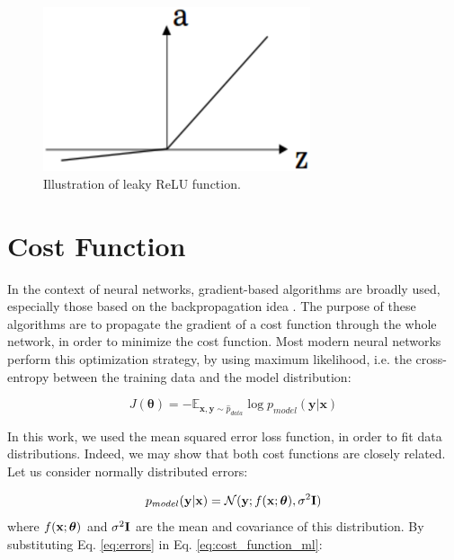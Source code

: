 \begin{figure}[!htbp]
	\centering
	\includegraphics[width=0.7\textwidth]{Cap3/leakyrelu.eps}
	\caption{Illustration of leaky ReLU function.}
	\label{fig:leakyrelu}
\end{figure}


\section{Cost Function}

In the context of neural networks, gradient-based algorithms are broadly used, especially those based on the backpropagation idea \cite{hinton88}. The purpose of these algorithms are to propagate the gradient of a cost function through the whole network, in order to minimize the cost function. Most modern neural networks perform this optimization strategy, by using maximum likelihood, i.e. the cross-entropy between the training data and the model distribution:

\begin{equation}
J(\boldsymbol{\theta}) = -\mathbb{E}_{\mathrm{\mathbf{x}},\mathrm{\mathbf{y}}\sim \hat{p}_{data}}\log{p_{model}(\mathrm{\mathbf{y}} | \mathrm{\mathbf{x}})}
\label{eq:cost_function_ml}
\end{equation}

In this work, we used the mean squared error loss function, in order to fit data distributions. Indeed, we may show that both cost functions are closely related. Let us consider normally distributed errors:

\begin{equation}
{p_{model}(\bvec{y} | \bvec{x})} = \mathcal{N}( \bvec{y}; f (\bvec{x}; \boldsymbol{\theta}), \sigma^{2}\bvec{I})
\label{eq:errors}
\end{equation}
where \(f (\mathrm{\mathbf{x}}; \boldsymbol{\theta})\) and \(\sigma^{2}\mathrm{\mathbf{I}}\)  are the mean and covariance of this distribution. By substituting Eq. \eqref{eq:errors} in Eq. \eqref{eq:cost_function_ml}:

